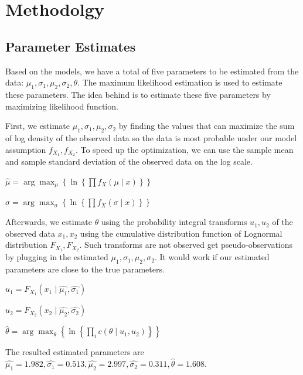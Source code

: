 \documentclass[11pt,]{article}
\begin{document}
\hypertarget{methodolgy}{%
\section{Methodolgy}\label{methodolgy}}

\hypertarget{parameter-estimates}{%
\subsection{Parameter Estimates}\label{parameter-estimates}}

Based on the models, we have a total of five parameters to be estimated
from the data: \(\mu_{1},\sigma_{1},\mu_{2},\sigma_{2},\theta\). The
maximum likelihood estimation is used to estimate these parameters. The
idea behind is to estimate these five parameters by maximizing
likelihood function.

First, we estimate \(\mu_{1},\sigma_{1},\mu_{2},\sigma_{2}\) by finding
the values that can maximize the sum of log density of the observed data
so the data is most probable under our model assumption
\(f_{X_{1}},f_{X_{2}}\). To speed up the optimization, we can use the
sample mean and sample standard deviation of the observed data on the
log scale.

\(\hat{\mu} = \arg \max_{\mu}\left\{\ln \left\{\prod f_{X}\left( \mu \mid x\right)\right\}\right\}\)

\(\hat{\sigma} = \arg \max _{\sigma}\left\{\ln \left\{\prod f_{X}\left( \sigma \mid x \right)\right\}\right\}\)

Afterwards, we estimate \(\theta\) using the probability integral
transforms \(u_1,u_2\) of the observed data \(x_1,x_2\) using the
cumulative distribution function of Lognormal distribution
\(F_{X_{1}},F_{X_{2}}\). Such transforms are not observed get
pseudo-observations by plugging in the estimated
\(\mu_{1},\sigma_{1},\mu_{2},\sigma_{2}\). It would work if our
estimated parameters are close to the true parameters.

\(u_1 = F_{X_{1}}(x_1 \mid \hat{\mu_1}, \hat{\sigma_1})\)

\(u_2 = F_{X_{2}}(x_2 \mid \hat{\mu_2}, \hat{\sigma_2})\)

\(\hat{\theta} = \arg \max _ {\theta}\left\{\ln \left\{\prod_{i} c\left(\theta \mid u_1, u_2\right)\right\}\right\}\)

The resulted estimated parameters are
\(\hat{\mu_{1}}= 1.982,\hat{\sigma_{1}}=0.513,\hat{\mu_{2}}=2.997,\hat{\sigma_{2}}=0.311,\hat{\theta}=1.608\).
\end{document}
